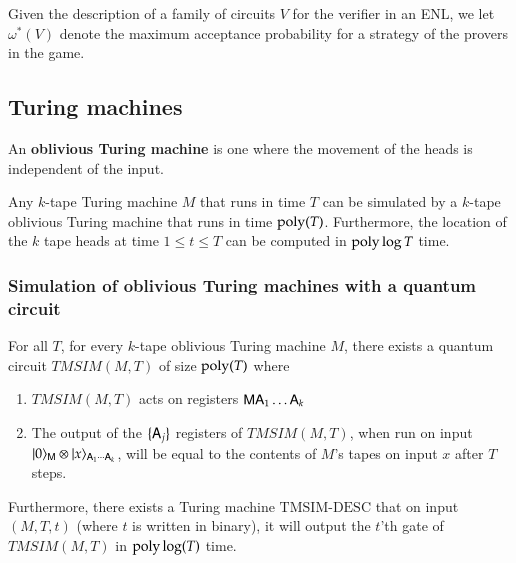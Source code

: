 \begin{definition}
Given the description of a family of circuits $V$ for the verifier in an ENL, we let $\omega^*(V)$ denote the maximum acceptance probability for a strategy of the provers in the game. 
\end{definition}


\subsection{Turing machines}
\label{sec:turing_machines}

An \textbf{oblivious Turing machine} is one where the movement of the heads is independent of the input.

\begin{theorem}\label{thm:pippenger}
Any $k$-tape Turing machine $M$ that runs in time $T$ can be simulated by a $k$-tape oblivious Turing machine that runs in time $\operatorname{poly}(T)$. Furthermore, the location of the $k$ tape heads at time $1 \leq t \leq T$ can be computed in $\operatorname{poly} \log T$ time.
\end{theorem}


\subsubsection{Simulation of oblivious Turing machines with a quantum circuit}

\begin{lemma}\label{lem:tmsim}
	For all $T$, for every $k$-tape oblivious Turing machine $M$, there exists a quantum circuit $TMSIM(M,T)$ of size $\operatorname{poly}(T)$ where
	\begin{enumerate}
		\item $TMSIM(M,T)$ acts on registers ${\mathsf{M}} {\mathsf{A}}_1 \ldots {\mathsf{A}}_k$
		\item The output of the $\{{\mathsf{A}}_j\}$ registers of $TMSIM(M,T)$, when run on input $|0\rangle_{{\mathsf{M}}} \otimes |x\rangle_{{\mathsf{A}}_1 \cdots {\mathsf{A}}_k}$, will be equal to the contents of $M$'s tapes on input $x$ after $T$ steps.
	\end{enumerate}
	Furthermore, there exists a Turing machine $\text{TMSIM-DESC}$ that on input $(M,T,t)$ (where $t$ is written in binary), it will output the $t$'th gate of $TMSIM(M,T)$ in $\operatorname{poly}\log(T)$ time. 
\end{lemma}

